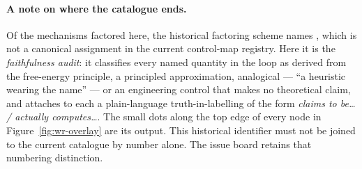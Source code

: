 \paragraph{A note on where the catalogue ends.} Of the \FactoringEdges{}
mechanisms factored here, the historical factoring scheme names , which is not a
canonical assignment in the current control-map registry. Here it is the \emph{faithfulness audit}: it classifies every named quantity in
the loop as derived from the free-energy principle, a principled approximation,
analogical --- ``a heuristic wearing the name'' --- or an engineering control
that makes no theoretical claim, and attaches to each a plain-language
truth-in-labelling of the form \emph{claims to be\ldots{} / actually
computes\ldots{}}. The small dots along the top edge of every node in
Figure~\ref{fig:wr-overlay} are its output. This historical identifier must not be joined to the current catalogue by
number alone. The issue board retains that numbering distinction.
